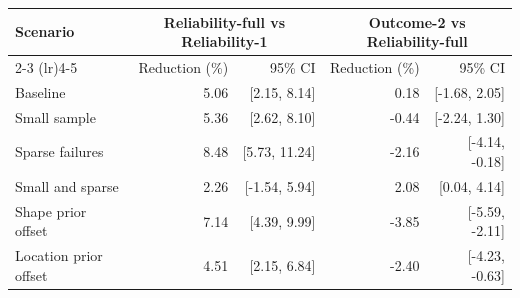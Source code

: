\begin{tabular}{lrrrr}
\toprule
Scenario & \multicolumn{2}{c}{Reliability-full vs Reliability-1} & \multicolumn{2}{c}{Outcome-2 vs Reliability-full} \\
\cmidrule(lr){2-3} \cmidrule(lr){4-5}
 & Reduction (\%) & 95\% CI & Reduction (\%) & 95\% CI \\
\midrule
Baseline & 5.06 & [2.15, 8.14] & 0.18 & [-1.68, 2.05] \\
Small sample & 5.36 & [2.62, 8.10] & -0.44 & [-2.24, 1.30] \\
Sparse failures & 8.48 & [5.73, 11.24] & -2.16 & [-4.14, -0.18] \\
Small and sparse & 2.26 & [-1.54, 5.94] & 2.08 & [0.04, 4.14] \\
Shape prior offset & 7.14 & [4.39, 9.99] & -3.85 & [-5.59, -2.11] \\
Location prior offset & 4.51 & [2.15, 6.84] & -2.40 & [-4.23, -0.63] \\
\bottomrule
\end{tabular}
